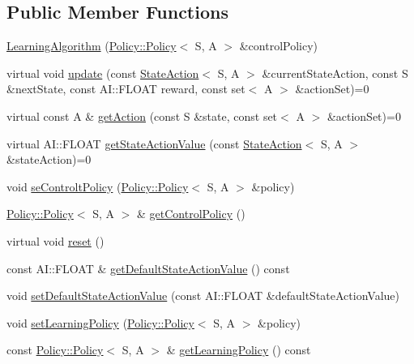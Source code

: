 \subsection*{Public Member Functions}
\begin{DoxyCompactItemize}
\item 
\hyperlink{classAI_1_1Algorithm_1_1LearningAlgorithm_a8fe54228193c0d7a28fba7de00441d7f}{Learning\-Algorithm} (\hyperlink{classAI_1_1Algorithm_1_1Policy_1_1Policy}{Policy\-::\-Policy}$<$ S, A $>$ \&control\-Policy)
\item 
virtual void \hyperlink{classAI_1_1Algorithm_1_1LearningAlgorithm_a7d216d791e558e15a73083af6257ed72}{update} (const \hyperlink{classAI_1_1StateAction}{State\-Action}$<$ S, A $>$ \&current\-State\-Action, const S \&next\-State, const A\-I\-::\-F\-L\-O\-A\-T reward, const set$<$ A $>$ \&action\-Set)=0
\item 
virtual const A \& \hyperlink{classAI_1_1Algorithm_1_1LearningAlgorithm_afeca4eded9bc0a02312ccbbfd05f8daa}{get\-Action} (const S \&state, const set$<$ A $>$ \&action\-Set)=0
\item 
virtual A\-I\-::\-F\-L\-O\-A\-T \hyperlink{classAI_1_1Algorithm_1_1LearningAlgorithm_a1044b2558109e8dd3d3bf5bedb9723b5}{get\-State\-Action\-Value} (const \hyperlink{classAI_1_1StateAction}{State\-Action}$<$ S, A $>$ \&state\-Action)=0
\item 
void \hyperlink{classAI_1_1Algorithm_1_1LearningAlgorithm_a1d26cb76c945a5312ce4ac4fdabc4d31}{se\-Controlt\-Policy} (\hyperlink{classAI_1_1Algorithm_1_1Policy_1_1Policy}{Policy\-::\-Policy}$<$ S, A $>$ \&policy)
\item 
\hyperlink{classAI_1_1Algorithm_1_1Policy_1_1Policy}{Policy\-::\-Policy}$<$ S, A $>$ \& \hyperlink{classAI_1_1Algorithm_1_1LearningAlgorithm_ab123635bc3d527052051c7f4c37a986c}{get\-Control\-Policy} ()
\item 
virtual void \hyperlink{classAI_1_1Algorithm_1_1LearningAlgorithm_aebe650b79f39ffd46ece7adb44ddaf60}{reset} ()
\item 
const A\-I\-::\-F\-L\-O\-A\-T \& \hyperlink{classAI_1_1Algorithm_1_1LearningAlgorithm_aafc85fe7b2ad9331ae41593784321641}{get\-Default\-State\-Action\-Value} () const 
\item 
void \hyperlink{classAI_1_1Algorithm_1_1LearningAlgorithm_a1da99bfa2de96f397a4ef07e53ab5697}{set\-Default\-State\-Action\-Value} (const A\-I\-::\-F\-L\-O\-A\-T \&default\-State\-Action\-Value)
\item 
void \hyperlink{classAI_1_1Algorithm_1_1LearningAlgorithm_a826f61675ac11b699c4328c44cccdae5}{set\-Learning\-Policy} (\hyperlink{classAI_1_1Algorithm_1_1Policy_1_1Policy}{Policy\-::\-Policy}$<$ S, A $>$ \&policy)
\item 
const \hyperlink{classAI_1_1Algorithm_1_1Policy_1_1Policy}{Policy\-::\-Policy}$<$ S, A $>$ \& \hyperlink{classAI_1_1Algorithm_1_1LearningAlgorithm_aac506aa1838ba12e2069c098d6faec16}{get\-Learning\-Policy} () const 
\end{DoxyCompactItemize}
